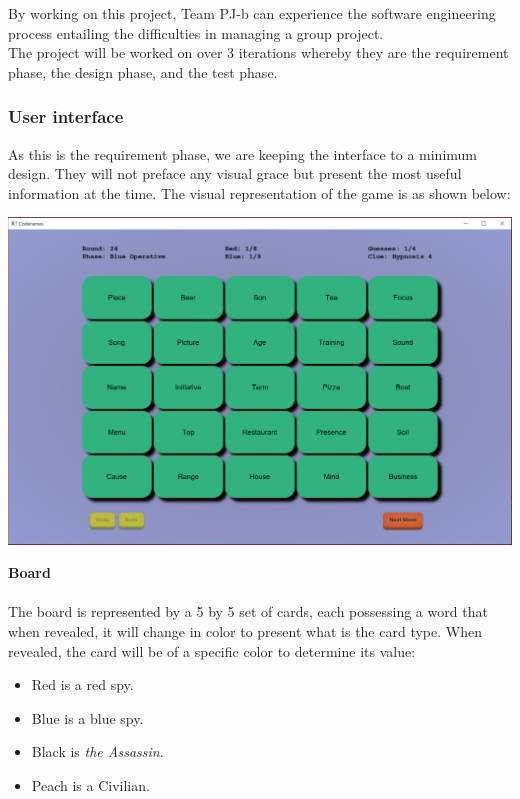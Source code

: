 \documentclass[10pt, a4paper]{article}
\begin{document}
	By working on this project, Team PJ-b can experience the software engineering process entailing the difficulties in managing a group project.\\
	
	The project will be worked on over 3 iterations whereby they are the requirement phase, the design phase, and the test phase.
	
		\subsubsection{User interface}
		
		As this is the requirement phase, we are keeping the interface to a minimum design. They will not preface any visual grace but present the most useful information at the time. The visual representation of the game is as shown below:\\
		
		\begin{center}
			\includegraphics[scale=0.2]{game_interface.png}
		\end{center}
	
		\textbf{Board}\\
		\\
		The board is represented by a 5 by 5 set of cards, each possessing a word that when revealed, it will change in color to present what is the card type. When revealed, the card will be of a specific color to determine its value:  
		    \begin{itemize}
		        \item Red is a red spy.
		        \item Blue is a blue spy.
		        \item Black is \textit{the Assassin}.
		        \item Peach is a Civilian.
		    \end{itemize}
		    
\end{document}
